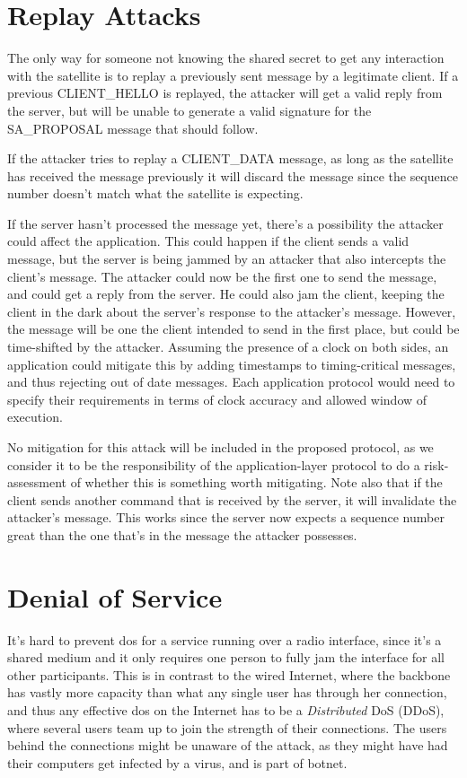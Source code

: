 \section{Replay Attacks}\label{sec:replay-attacks}

The only way for someone not knowing the shared secret to get any interaction with the satellite is to replay a previously sent message by a legitimate client. If a previous CLIENT\_HELLO is replayed, the attacker will get a valid reply from the server, but will be unable to generate a valid signature for the SA\_PROPOSAL message that should follow.

If the attacker tries to replay a CLIENT\_DATA message, as long as the satellite has received the message previously it will discard the message since the sequence number doesn't match what the satellite is expecting.

If the server hasn't processed the message yet, there's a possibility the attacker could affect the application. This could happen if the client sends a valid message, but the server is being jammed by an attacker that also intercepts the client's message. The attacker could now be the first one to send the message, and could get a reply from the server. He could also jam the client, keeping the client in the dark about the server's response to the attacker's message. However, the message will be one the client intended to send in the first place, but could be time-shifted by the attacker. Assuming the presence of a clock on both sides, an application could mitigate this by adding timestamps to timing-critical messages, and thus rejecting out of date messages. Each application protocol would need to specify their requirements in terms of clock accuracy and allowed window of execution.

No mitigation for this attack will be included in the proposed protocol, as we consider it to be the responsibility of the application-layer protocol to do a risk-assessment of whether this is something worth mitigating. Note also that if the client sends another command that is received by the server, it will invalidate the attacker's message. This works since the server now expects a sequence number great than the one that's in the message the attacker possesses.


\section{Denial of Service}

It's hard to prevent \acrfull{dos} for a service running over a radio interface, since it's a shared medium and it only requires one person to fully jam the interface for all other participants. This is in contrast to the wired Internet, where the backbone has vastly more capacity than what any single user has through her connection, and thus any effective \gls{dos} on the Internet has to be a \emph{Distributed} DoS (DDoS), where several users team up to join the strength of their connections. The users behind the connections might be unaware of the attack, as they might have had their computers get infected by a virus, and is part of botnet.

